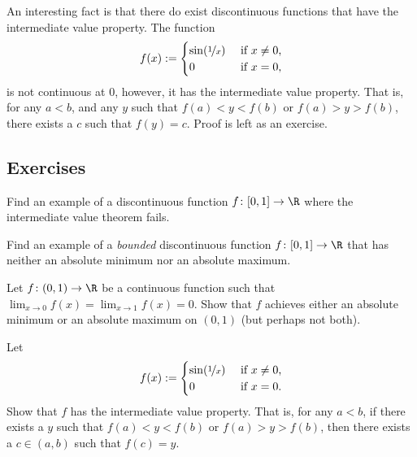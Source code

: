 \documentclass[12pt]{book}
\begin{document}
\begin{example}
An interesting fact is that there do exist discontinuous functions that have
the intermediate value property.
The function
\begin{equation*}
f(x) :=
\begin{cases}
\sin(\nicefrac{1}{x}) & \text{ if $x \not= 0$,} \\
0 & \text{ if $x=0$,}
\end{cases}
\end{equation*}
is not continuous at 0, however, it has the intermediate value property.
That is, for any $a < b$, and any $y$ such that $f(a) < y < f(b)$
or $f(a) > y > f(b)$,
there exists a $c$ such that $f(y) = c$.
Proof is left as an exercise.
\end{example}

\subsection*{Exercises}

\begin{exercise}
Find an example of a discontinuous function $f \colon [0,1] \to \R$
where the intermediate value theorem fails.
\end{exercise}

\begin{exercise}
Find an example of a \emph{bounded} discontinuous function $f \colon [0,1]
\to \R$ that has neither an absolute minimum nor an absolute maximum.
\end{exercise}

\begin{exercise}
Let $f \colon (0,1) \to \R$ be a continuous function such that
$\displaystyle \lim_{x\to 0} f(x) =
\displaystyle \lim_{x\to 1} f(x) = 0$.
Show that
$f$ achieves either an absolute minimum or an absolute maximum on $(0,1)$
(but perhaps not both).
\end{exercise}

\begin{exercise}
Let
\begin{equation*}
f(x) :=
\begin{cases}
\sin(\nicefrac{1}{x}) & \text{ if $x \not= 0$,} \\
0 & \text{ if $x=0$.}
\end{cases}
\end{equation*}
Show that $f$ has the intermediate value property.
That is, for any $a < b$, if there exists a $y$ such that $f(a) < y < f(b)$
or $f(a) > y > f(b)$, then
there exists a $c \in (a,b)$ such that $f(c) = y$.
\end{exercise}
\end{document}
